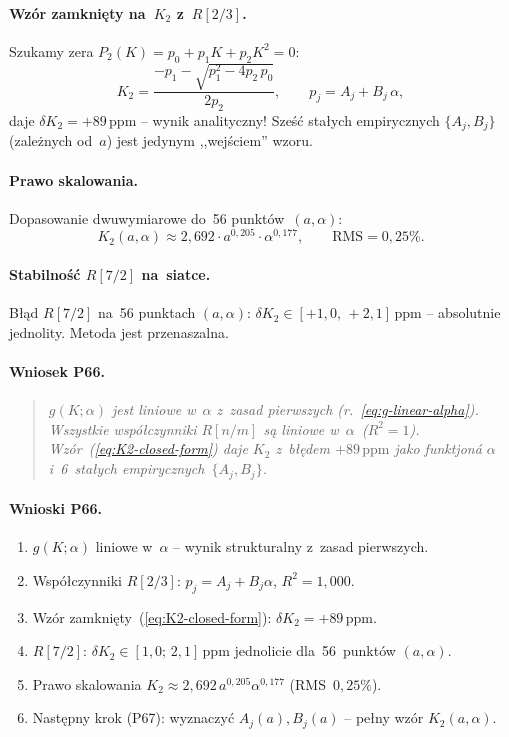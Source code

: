 \paragraph{Wz\'or zamkni\k{e}ty na~$K_2$ z~$R[2/3]$.}
Szukamy zera $P_2(K)=p_0+p_1 K+p_2 K^2=0$:
\begin{equation}
  \boxed{K_2 = \frac{-p_1 - \sqrt{p_1^2 - 4p_2\,p_0}}{2p_2},
  \qquad p_j = A_j + B_j\,\alpha,}
  \label{eq:K2-closed-form}
\end{equation}
daje $\delta K_2 = +89\,\mathrm{ppm}$ -- wynik analityczny!
Sze\'s\'c sta\l{}ych empirycznych $\{A_j, B_j\}$ (zale\.znych od~$a$)
jest jedynym ,,wej\'sciem'' wzoru.

\paragraph{Prawo skalowania.}
Dopasowanie dwuwymiarowe do~56 punkt\'ow~$(a,\alpha)$:
\begin{equation}
  K_2(a,\alpha) \approx 2{,}692\cdot a^{0{,}205}\cdot\alpha^{0{,}177},
  \qquad \text{RMS} = 0{,}25\%.
  \label{eq:K2-scaling}
\end{equation}

\paragraph{Stabilno\'s\'c $R[7/2]$ na~siatce.}
B\l{}\k{a}d $R[7/2]$ na~56 punktach $(a,\alpha)$:
$\delta K_2 \in [+1{,}0,\,+2{,}1]\,\mathrm{ppm}$ -- absolutnie jednolity.
Metoda jest przenaszalna.

\paragraph{Wniosek P66.}
\begin{quote}
\emph{$g(K;\alpha)$ jest liniowe w~$\alpha$ z~zasad pierwszych (r.~\ref{eq:g-linear-alpha}).
Wszystkie wsp\'o\l{}czynniki $R[n/m]$ s\k{a} liniowe w~$\alpha$~($R^2=1$).
Wz\'or~(\ref{eq:K2-closed-form}) daje $K_2$ z~b\l{}\k{e}dem $+89\,\mathrm{ppm}$
jako funktjon\'a $\alpha$ i~6~sta\l{}ych empirycznych~$\{A_j, B_j\}$.}
\end{quote}

\paragraph{Wnioski P66.}
\begin{enumerate}
  \item $g(K;\alpha)$ liniowe w~$\alpha$ -- wynik strukturalny z~zasad pierwszych.
  \item Wsp\'o\l{}czynniki $R[2/3]$: $p_j=A_j+B_j\alpha$, $R^2=1{,}000$.
  \item Wz\'or zamkni\k{e}ty~(\ref{eq:K2-closed-form}): $\delta K_2=+89\,\mathrm{ppm}$.
  \item $R[7/2]$: $\delta K_2\in[1{,}0;\,2{,}1]\,\mathrm{ppm}$ jednolicie dla~56~punkt\'ow $(a,\alpha)$.
  \item Prawo skalowania $K_2\approx2{,}692\,a^{0{,}205}\alpha^{0{,}177}$ (RMS~$0{,}25\%$).
  \item Nast\k{e}pny krok (P67): wyznaczy\'c $A_j(a), B_j(a)$ -- pe\l{}ny wz\'or $K_2(a,\alpha)$.
\end{enumerate}

